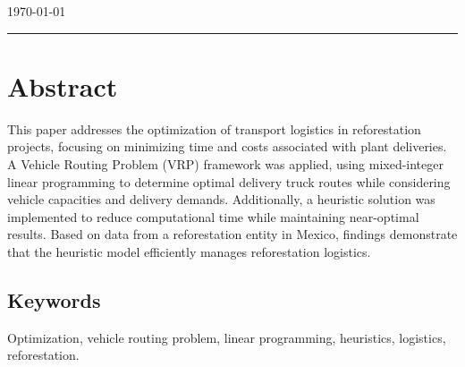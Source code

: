 \documentclass{amsart}
\begin{document}
\begin{center}
        \vspace{0.3cm}
        {\small \today}
        \vspace{0.5cm}
        
        \rule{16.5cm}{0.1pt}
    \end{center}



\section*{Abstract}
    This paper addresses the optimization of transport logistics in reforestation projects, focusing on minimizing time and costs associated with plant deliveries. A Vehicle Routing Problem (VRP) framework was applied, using mixed-integer linear programming to determine optimal delivery truck routes while considering vehicle capacities and delivery demands. Additionally, a heuristic solution was implemented to reduce computational time while maintaining near-optimal results. Based on data from a reforestation entity in Mexico, findings demonstrate that the heuristic model efficiently manages reforestation logistics.
    
{\subsection*{Keywords} Optimization, vehicle routing problem, linear programming, heuristics, logistics, reforestation.}
\end{document}
